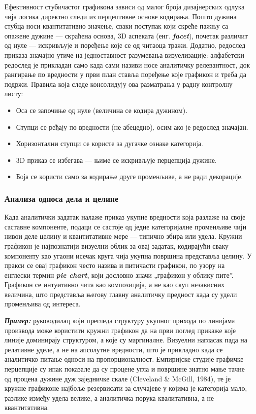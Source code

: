 Ефективност стубичастог графикона зависи од малог броја дизајнерских одлука чија логика директно следи из перцептивне основе кодирања. Пошто дужина стубца носи квантитативно значење, сваки поступак који скреће пажњу са опажене дужине — скраћена основа, 3D аспеката (енг. \textbf{\textit{facet}}), почетак различит од нуле — искривљује и поређење које се од читаоца тражи. Додатно, редослед приказа значајно утиче на једноставност разумевања визуелизације: алфабетски редослед је прикладан само када сами називи носе аналитичку релевантност, док рангирање по вредности у први план ставља поређење које графикон и треба да подржи. Правила која следе консолидују ова разматрања у радну контролну листу:

\begin{itemize}
  \item Оса се започиње од нуле (величина се кодира дужином).
  \item Ступци се ређају по вредности (не абецедно), осим ако је редослед значајан.
  \item Хоризонтални ступци се користе за дугачке ознаке категорија.
  \item 3D приказ се избегава — њиме се искривљује перцепција дужине.
  \item Боја се користи само за кодирање друге променљиве, а не ради декорације.
\end{itemize}

\subsubsection{Анализа односа дела и целине}
Када аналитички задатак налаже приказ укупне вредности која разлаже на своје саставне компоненте, подаци се састоје од једне категоријалне променљиве чији нивои деле целину и квантитативне мере — типично збира или удела. Кружни графикон је најпознатији визуелни облик за овај задатак, кодирајући сваку компоненту као угаони исечак круга чија укупна површина представља целину. У пракси се овај графикон често назива и питичасти графикон, по узору на енглески термин \textbf{\textit{pie chart}}, који дословно значи „графикон у облику пите”. Графикон се интуитивно чита као композиција, а не као скуп независних величина, што представља његову главну аналитичку предност када су удели променљива од интереса.

\textbf{\textit{Пример:}} руководилац који прегледа структуру укупног прихода по линијама производа може користити кружни графикон да на први поглед прикаже које линије доминирају структуром, а које су маргиналне. Визуелни нагласак пада на релативне уделе, а не на апсолутне вредности, што је прикладно када се аналитичко питање односи на пропорционалност. Емпиријске студије графичке перцепције су ипак показале да су процене угла и површине знатно мање тачне од процена дужине дуж заједничке скале (Cleveland \& McGill, 1984), те је кружне графиконе најбоље резервисати за случајеве у којима је категорија мало, разлике између удела велике, а аналитичка порука квалитативна, а не квантитативна.

